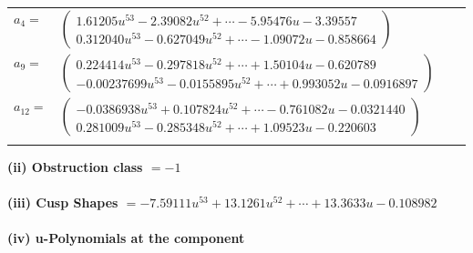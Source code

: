 \documentclass[1p]{elsarticle_modified}
\theoremstyle{definition}
\begin{document}
\begin{tabular}{m{7pt} m{180pt} m{7pt} m{180pt} }
\flushright $a_{4}=$&$\begin{pmatrix}1.61205 u^{53}-2.39082 u^{52}+\cdots-5.95476 u-3.39557\\0.312040 u^{53}-0.627049 u^{52}+\cdots-1.09072 u-0.858664\end{pmatrix}$ \\
\flushright $a_{9}=$&$\begin{pmatrix}0.224414 u^{53}-0.297818 u^{52}+\cdots+1.50104 u-0.620789\\-0.00237699 u^{53}-0.0155895 u^{52}+\cdots+0.993052 u-0.0916897\end{pmatrix}$ \\
\flushright $a_{12}=$&$\begin{pmatrix}-0.0386938 u^{53}+0.107824 u^{52}+\cdots-0.761082 u-0.0321440\\0.281009 u^{53}-0.285348 u^{52}+\cdots+1.09523 u-0.220603\end{pmatrix}$\\&\end{tabular}
\flushleft \textbf{(ii) Obstruction class $= -1$}\\~\\
\flushleft \textbf{(iii) Cusp Shapes $= -7.59111 u^{53}+13.1261 u^{52}+\cdots+13.3633 u-0.108982$}\\~\\
\newpage\renewcommand{\arraystretch}{1}
\flushleft \textbf{(iv) u-Polynomials at the component}\newline \\
\end{document}
